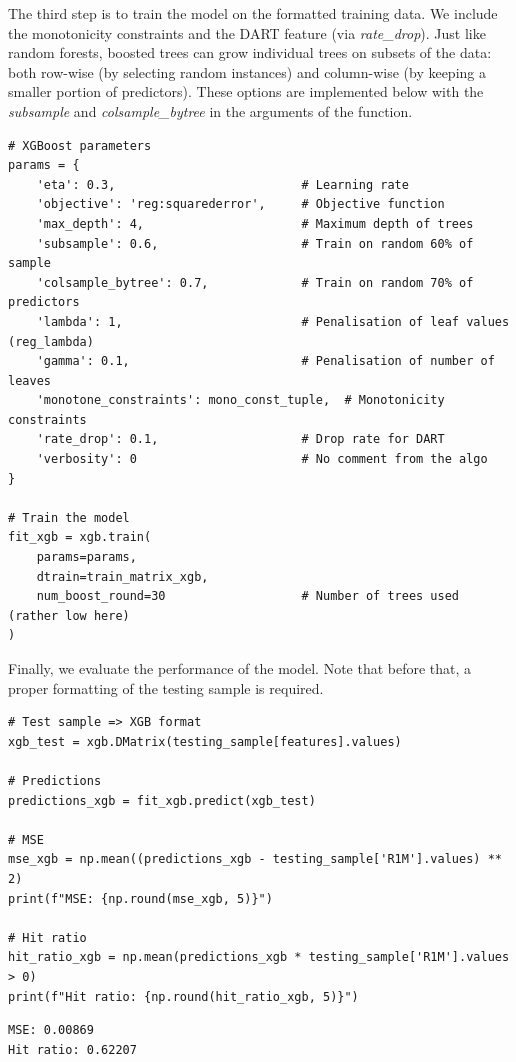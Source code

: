 The third step is to train the model on the formatted training data. We include the monotonicity constraints and the DART feature (via \textit{rate\_drop}). Just like random forests, boosted trees can grow individual trees on subsets of the data: both row-wise (by selecting random instances) and column-wise (by keeping a smaller portion of predictors). These options are implemented below with the \textit{subsample} and \textit{colsample\_bytree} in the arguments of the function.

\begin{verbatim}
# XGBoost parameters
params = {
    'eta': 0.3,                          # Learning rate
    'objective': 'reg:squarederror',     # Objective function
    'max_depth': 4,                      # Maximum depth of trees
    'subsample': 0.6,                    # Train on random 60% of sample
    'colsample_bytree': 0.7,             # Train on random 70% of predictors
    'lambda': 1,                         # Penalisation of leaf values (reg_lambda)
    'gamma': 0.1,                        # Penalisation of number of leaves
    'monotone_constraints': mono_const_tuple,  # Monotonicity constraints
    'rate_drop': 0.1,                    # Drop rate for DART
    'verbosity': 0                       # No comment from the algo
}

# Train the model
fit_xgb = xgb.train(
    params=params,
    dtrain=train_matrix_xgb,
    num_boost_round=30                   # Number of trees used (rather low here)
)
\end{verbatim}

Finally, we evaluate the performance of the model. Note that before that, a proper formatting of the testing sample is required.

\begin{verbatim}
# Test sample => XGB format
xgb_test = xgb.DMatrix(testing_sample[features].values)

# Predictions
predictions_xgb = fit_xgb.predict(xgb_test)

# MSE
mse_xgb = np.mean((predictions_xgb - testing_sample['R1M'].values) ** 2)
print(f"MSE: {np.round(mse_xgb, 5)}")

# Hit ratio
hit_ratio_xgb = np.mean(predictions_xgb * testing_sample['R1M'].values > 0)
print(f"Hit ratio: {np.round(hit_ratio_xgb, 5)}")
\end{verbatim}

\begin{verbatim}
MSE: 0.00869
Hit ratio: 0.62207
\end{verbatim}

